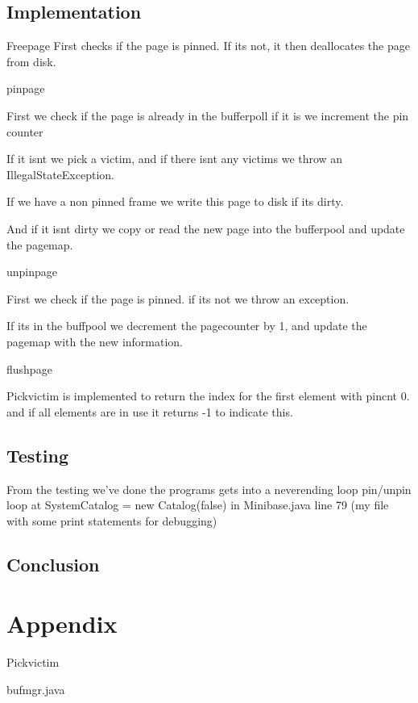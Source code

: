\documentclass[a4paper,10pt,titlepage]{report}
\begin{document}
\subsection{Implementation}
Freepage First checks if the page is pinned. If its not, it then deallocates the page from disk.

\vspace{10mm}
pinpage

First we check if the page is already in the bufferpoll if it is we increment the pin counter

If it isnt we pick a victim, and if there isnt any victims we throw an IllegalStateException.

If we have a non pinned frame we write this page to disk if its dirty.

And if it isnt dirty we  copy or read the new page into the bufferpool and update the pagemap.

\vspace{10mm}
unpinpage

First we check if the page is pinned. if its not we throw an exception.

If its in the buffpool we decrement the pagecounter by 1, and update the pagemap with the new information.

\vspace{10mm}
flushpage

\vspace{10mm}

Pickvictim is implemented to return the index for the first element with pincnt 0. and if all elements are in use it returns -1 to indicate this.


\subsection{Testing}
From the testing we've done the programs gets into a neverending loop pin/unpin loop at SystemCatalog = new Catalog(false) in Minibase.java line 79 (my file with some print statements for debugging)
\subsection{Conclusion}



\section{Appendix}
Pickvictim


bufmgr.java

\end{document}
